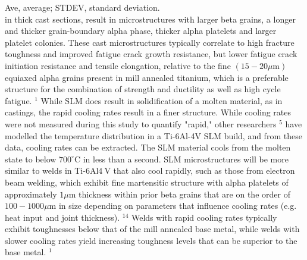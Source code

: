 \documentclass[10pt]{article}
\begin{document}
Ave, average; STDEV, standard deviation.\\
in thick cast sections, result in microstructures with larger beta grains, a longer and thicker grain-boundary alpha phase, thicker alpha platelets and larger platelet colonies. These cast microstructures typically correlate to high fracture toughness and improved fatigue crack growth resistance, but lower fatigue crack initiation resistance and tensile elongation, relative to the fine $(15-20 \mu \mathrm{m})$ equiaxed alpha grains present in mill annealed titanium, which is a preferable structure for the combination of strength and ductility as well as high cycle fatigue. ${ }^{1}$ While SLM does result in solidification of a molten material, as in castings, the rapid cooling rates result in a finer structure. While cooling rates were not measured during this study to quantify "rapid," other researchers ${ }^{5}$ have modelled the temperature distribution in a Ti-6Al-4V SLM build, and from these data, cooling rates can be extracted. The SLM material cools from the molten state to below $700^{\circ} \mathrm{C}$ in less than a second. SLM microstructures will be more similar to welds in Ti-6Al$4 \mathrm{~V}$ that also cool rapidly, such as those from electron beam welding, which exhibit fine martensitic structure with alpha platelets of approximately $1 \mu \mathrm{m}$ thickness within prior beta grains that are on the order of $100-1000 \mu \mathrm{m}$ in size depending on parameters that influence cooling rates (e.g. heat input and joint thickness). ${ }^{14}$ Welds with rapid cooling rates typically exhibit toughnesses below that of the mill annealed base metal, while welds with slower cooling rates yield increasing toughness levels that can be superior to the base metal. ${ }^{1}$
\end{document}
